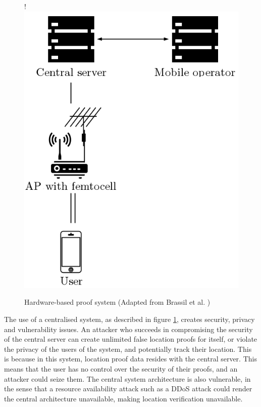 \begin{figure}[H]
\begin{center}
 {!} {\includegraphics{diagrams/hp_paper.png}}
\caption{Hardware-based proof system (Adapted from Brassil et al. \cite{brassil})}
\label{fig:hp_labs}
\end{center}
\end{figure}

The use of a centralised system, as described in figure \ref{fig:hp_labs}, creates security, privacy and vulnerability issues. An attacker who succeeds in compromising the security of the central server can create unlimited false location proofs for itself, or violate the privacy of the users of the system, and potentially track their location. This is because in this system, location proof data resides with the central server. This means that the user has no control over the security of their proofs, and an attacker could seize them. The central system architecture is also vulnerable, in the sense that a resource availability attack such as a DDoS attack \cite{ddos} could render the central architecture unavailable, making location verification unavailable.
\\

